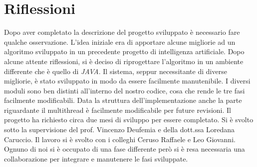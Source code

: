 \section{Riflessioni}
Dopo aver completato la descrizione del progetto sviluppato è necessario fare qualche osservazione.
L'idea iniziale era di apportare alcune migliorie ad un algoritmo sviluppato in un precedente progetto di intelligenza artificiale\cite{tesinaIA}. Dopo alcune attente riflessioni, si è deciso di riprogettare l'algoritmo in un ambiente differente che è quello di \emph{JAVA}.
Il sistema, seppur necessitante di diverse migliorie, è stato sviluppato in modo da essere facilmente manutenibile. I diversi moduli sono ben distinti all'interno del nostro codice, cosa che rende le tre fasi facilmente modificabili. Data la struttura dell'implementazione anche la parte riguardante il multithread è facilmente modificabile per future revisioni.
Il progetto ha richiesto circa due mesi di sviluppo per essere completato. Si è svolto sotto la supervisione del prof. Vincenzo Deufemia e della dott.ssa Loredana Caruccio. Il lavoro si è svolto con i colleghi Ceruso Raffaele e Leo Giovanni. Ognuno di noi si è occupato di una fase differente però si è resa necessaria una collaborazione per integrare e manutenere le fasi sviluppate. 
